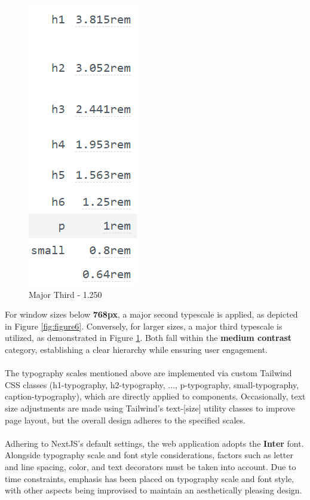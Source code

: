 \begin{figure}[h]
\begin{minipage}{0.45\textwidth}
        \includegraphics[width=0.5\linewidth]{images/typography-major-third.png}
        \caption{Major Third - 1.250}
        \label{fig:figure7}
    \end{minipage}
\end{figure}

\noindent For window sizes below \textbf{768px}, a major second typescale is applied, as depicted in Figure \ref{fig:figure6}. Conversely, for larger sizes, a major third typescale is utilized, as demonstrated in Figure \ref{fig:figure7}. Both fall within the \textbf{medium contrast} category, establishing a clear hierarchy while ensuring user engagement. %
\\\\
\noindent The typography scales mentioned above are implemented via custom Tailwind CSS classes (h1-typography, h2-typography, ..., p-typography, small-typography, caption-typography), which are directly applied to components. Occasionally, text size adjustments are made using Tailwind's text-[size] utility classes to improve page layout, but the overall design adheres to the specified scales.
\\\\
\noindent Adhering to NextJS's default settings, the web application adopts the \textbf{Inter} font. Alongside typography scale and font style considerations, factors such as letter and line spacing, color, and text decorators must be taken into account. Due to time constraints, emphasis has been placed on typography scale and font style, with other aspects being improvised to maintain an aesthetically pleasing design.

